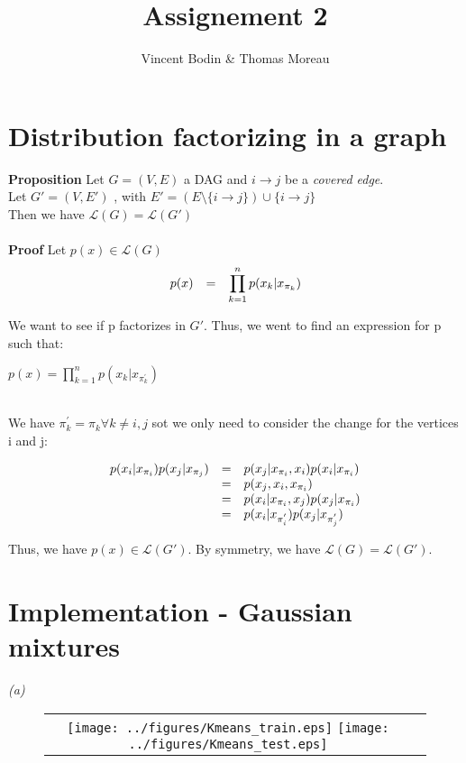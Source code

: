 \documentclass[11pt]{article}
\title{\textbf{Assignement 2}}
\author{Vincent Bodin \& Thomas Moreau}
\date{}
\begin{document}
\maketitle

\section{Distribution factorizing in a graph}

\textbf{Proposition} Let $G = (V, E)$ a DAG and $i \rightarrow j$ be a \textit{covered edge}.\\
Let  $G' = (V, E')$ , with $E' = (E\setminus\{i\rightarrow j\})\cup \{i \rightarrow j\}$\\
Then we have $\mathcal{L}(G) = \mathcal{L}(G')$\\
\\
\textbf{Proof}  Let $p(x) \in \mathcal{L}(G)$\\
\begin{equation*}
\begin{array}{r l l}
p(x) &=& \displaystyle\prod_{k=1}^{n} p(x_k | x_{\pi_k})\\
\end{array}
\end{equation*}

We want to see if p factorizes in $G'$. Thus, we went to find an expression for p such that:\\
\centerline{$p(x) = \displaystyle\prod_{k=1}^{n} p(x_k | x_{\pi_k^{'}})$}
\\
We have $\pi_k^{'} = \pi_k \forall k \neq i,j$ sot we only need to consider the change for the vertices i and j:


\begin{equation*}
\begin{array}{r l l}
p(x_i| x_{\pi_i}) p(x_j | x_{\pi_j}) &=& p(x_j | x_{\pi_i}, x_i) p(x_i | x_{\pi_i})\\
&=& p(x_j, x_i, x_{\pi_i})\\
&=& p(x_i | x_{\pi_i}, x_j) p(x_j | x_{\pi_i})\\
&=& p(x_i| x_{\pi_i^{'}}) p(x_j | x_{\pi_j^{'}})\\
\end{array}
\end{equation*}

Thus, we have $p(x) \in \mathcal{L}(G')$. By symmetry, we have $\mathcal{L}(G) = \mathcal{L}(G')$.


\section{Implementation - Gaussian mixtures\\}

\emph{(a)}

\begin{figure}
\begin{tabular}{c c}
\texttt{[image: ../figures/Kmeans\_train.eps]}
\texttt{[image: ../figures/Kmeans\_test.eps]}
\end{tabular}
\end{figure}
\end{document}
